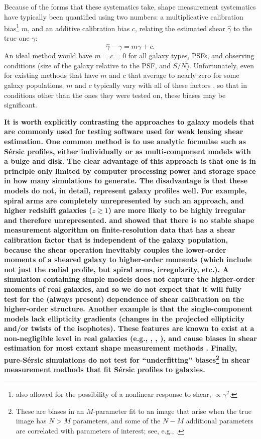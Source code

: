 \documentclass[twocolumn,useAMS,usenatbib]{mn2e}
\newcommand{\beq}{\begin{equation}}
\newcommand{\eeq}{\end{equation}}
\newcommand{\reftext}[1]{\textbf{#1}}
\begin{document}
Because of the forms that these systematics take, shape measurement
systematics have typically been quantified
\citep{2006MNRAS.368.1323H,2007MNRAS.376...13M} using two numbers: a
multiplicative calibration bias\footnote{\cite{2007MNRAS.376...13M} also allowed for the
  possibility of a nonlinear response to shear, $\propto \gamma^2$.}
$m$, and an additive calibration bias $c$,
relating the estimated shear $\hat{\gamma}$ to the true one
$\gamma$:
\beq
\hat{\gamma} - \gamma = m\gamma + c.
\eeq
An ideal method would have $m=c=0$ for all galaxy types, PSFs, and
observing conditions (size of the galaxy relative to the PSF, and
$S/N$).  Unfortunately, even for existing methods that have $m$ and
$c$ that 
average to nearly zero for some galaxy populations, $m$ and $c$ typically 
vary with all of these factors \citep{2007MNRAS.376...13M,2010MNRAS.405.2044B}, so that in conditions other than
the ones they were tested on, these biases may be significant.

\reftext{It is worth explicitly contrasting the approaches to galaxy
  models that are commonly used for testing software used for weak
  lensing shear estimation.  One common method is to use analytic
  formulae such as S\'ersic profiles, either individually or as
  multi-component models with a bulge and disk.  The clear advantage
  of this approach is that one is in principle only limited by
  computer processing power and storage space in how many simulations
  to generate.  The disadvantage is that these models do not, in
  detail, represent galaxy profiles well.  For example, spiral arms
  are completely unrepresented by such an approach, and higher
  redshift galaxies ($z\gtrsim 1$) are more likely to be highly irregular and
  therefore unrepresented.  \citet{2007MNRAS.380..229M}
  and \citet{2011MNRAS.414.1047Z} showed that there is no
  stable shape measurement algorithm on finite-resolution data that
  has a shear calibration factor that is independent of the galaxy
  population, because the shear operation inevitably couples the
  lower-order moments of a sheared galaxy to higher-order moments
  (which include not just the radial profile, but spiral arms,
  irregularity, etc.).  A simulation containing simple models does not
  capture the higher-order moments of real galaxies, and so we do not
  expect that it will fully test for the (always present) dependence
  of shear calibration on the higher-order structure.  Another example is that the single-component
  models lack ellipticity gradients (changes in the projected
  ellipticity and/or twists of the isophotes).  These features are known to
  exist at a non-negligible level in real
  galaxies (e.g., \citealt{1985MNRAS.216..429L}, \citealt{2006MNRAS.370.1339H}, \citealt{2009ApJS..182..216K}), and cause biases in shear estimation for most extant
  shape measurement methods \citep{2010MNRAS.406.2793B}.  Finally,
  pure-S\'ersic simulations do not test for ``underfitting''
  biases\footnote{These are biases in an $M$-parameter fit to an image
    that arise when the true image has $N>M$ parameters, and some of
    the $N-M$ additional parameters are correlated with parameters of
    interest; see, e.g., \citealt{2010MNRAS.406.2793B}.} in shear measurement methods that fit S\'ersic
  profiles to galaxies.}
\end{document}
